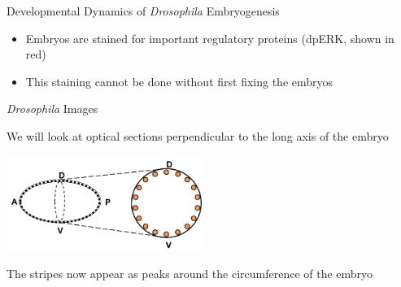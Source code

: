 \documentclass[10pt,aspectratio=169]{beamer}
\begin{document}
\begin{frame}{Developmental Dynamics of {\em Drosophila} Embryogenesis}
\begin{center}
\end{center}

\begin{itemize}
\item Embryos are stained for important regulatory proteins (dpERK, shown in red) 

\item This staining cannot be done without first fixing the embryos
\end{itemize}

\end{frame}

\begin{frame}{{\em Drosophila} Images}

\begin{center}
We will look at optical sections perpendicular to the long axis of the embryo

\includegraphics[width=2.5in]{drosophila_schematic}


The stripes now appear as peaks around the circumference of the embryo

\end{center}

\end{frame}
\end{document}
